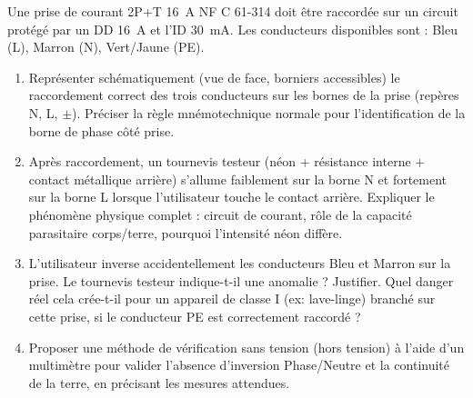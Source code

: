 \documentclass[11pt]{article}
\begin{document}
\begin{exercice}
Une prise de courant 2P+T \SI{16}{A} NF C 61-314 doit être raccordée sur un circuit protégé par un DD \SI{16}{A} et l'ID \SI{30}{mA}. Les conducteurs disponibles sont : Bleu (L), Marron (N), Vert/Jaune (PE).
\begin{enumerate}
    \item Représenter schématiquement (vue de face, borniers accessibles) le raccordement correct des trois conducteurs sur les bornes de la prise (repères N, L, $\pm$). Préciser la règle mnémotechnique normale pour l'identification de la borne de phase côté prise.
    \item Après raccordement, un tournevis testeur (néon + résistance interne + contact métallique arrière) s'allume faiblement sur la borne N et fortement sur la borne L lorsque l'utilisateur touche le contact arrière. Expliquer le phénomène physique complet : circuit de courant, rôle de la capacité parasitaire corps/terre, pourquoi l'intensité néon diffère.
    \item L'utilisateur inverse accidentellement les conducteurs Bleu et Marron sur la prise. Le tournevis testeur indique-t-il une anomalie ? Justifier. Quel danger réel cela crée-t-il pour un appareil de classe I (ex: lave-linge) branché sur cette prise, si le conducteur PE est correctement raccordé ?
    \item Proposer une méthode de vérification \og sans tension \fg (hors tension) à l'aide d'un multimètre pour valider l'absence d'inversion Phase/Neutre et la continuité de la terre, en précisant les mesures attendues.
\end{enumerate}
\end{exercice}
\end{document}
